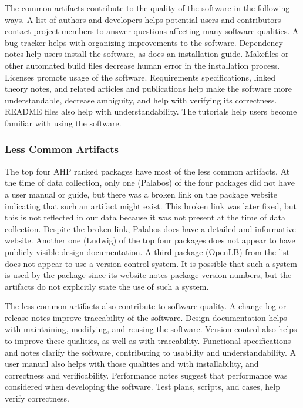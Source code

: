 \documentclass[final, 3p, times, authoryear]{elsarticle}
\begin{document}
The common artifacts contribute to the quality of the software in the following
ways. A list of authors and developers helps potential users and contributors
contact project members to answer questions affecting many software qualities. A
bug tracker helps with organizing improvements to the software. Dependency notes
help users install the software, as does an installation guide. Makefiles or
other automated build files decrease human error in the installation process.
Licenses promote usage of the software. Requirements specifications, linked
theory notes, and related articles and publications help make the software more
understandable, decrease ambiguity, and help with verifying its correctness.
README files also help with understandability. The tutorials help users become
familiar with using the software.


\subsubsection{Less Common Artifacts} \label{lesscommon}

The top four AHP ranked packages have most of the less common artifacts. At the
time of data collection, only one (Palabos) of the four packages did not have a
user manual or guide, but there was a broken link on the package website
indicating that such an artifact might exist. This broken link was later fixed,
but this is not reflected in our data because it was not present at the time of
data collection. Despite the broken link, Palabos does have a detailed and
informative website. Another one (Ludwig) of the top four packages does not
appear to have publicly visible design documentation. A third package (OpenLB)
from the list does not appear to use a version control system. It is possible
that such a system is used by the package since its website notes package
version numbers, but the artifacts do not explicitly state the use of such a
system.

The less common artifacts also contribute to software quality. A change log or
release notes improve traceability of the software. Design documentation helps
with maintaining, modifying, and reusing the software. Version control also
helps to improve these qualities, as well as with traceability. Functional
specifications and notes clarify the software, contributing to usability and
understandability. A user manual also helps with those qualities and with
installability, and correctness and verificability. Performance notes suggest
that performance was considered when developing the software. Test plans,
scripts, and cases, help verify correctness. 
\end{document}
